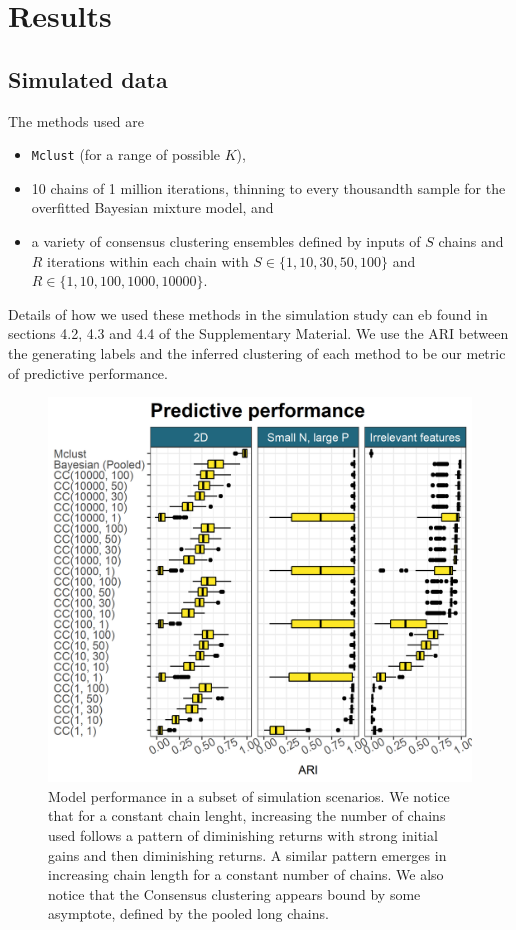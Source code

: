 \documentclass{bioinfo}
\begin{document}
\section{Results}
\subsection{Simulated data}
The methods used are 
\begin{itemize}
	\item \texttt{Mclust} (for a range of possible $K$),
	\item 10 chains of 1 million iterations, thinning to every thousandth sample for the overfitted Bayesian mixture model, and
	\item a variety of consensus clustering ensembles defined by inputs of $S$ chains and $R$ iterations within each chain with $S \in \{1, 10, 30, 50, 100\}$ and $R \in \{1, 10, 100, 1000, 10000\}$.
\end{itemize}
Details of how we used these methods in the simulation study can eb found in sections 4.2, 4.3 and 4.4 of the Supplementary Material. We use the ARI between the generating labels and the inferred clustering of each method to be our metric of predictive performance.
\begin{figure} %
	\centering
	\includegraphics[scale=0.55]{./Images/Simulations/simulation_model_prediction.png}
	\caption{Model performance in a subset of simulation scenarios. We notice that for a constant chain lenght, increasing the number of chains used follows a pattern of diminishing returns with strong initial gains and then diminishing returns. A similar pattern emerges in increasing chain length for a constant number of chains. We also notice that the Consensus clustering appears bound by some asymptote, defined by the pooled long chains.}
	\label{fig:simResults}
\end{figure}
\end{document}

